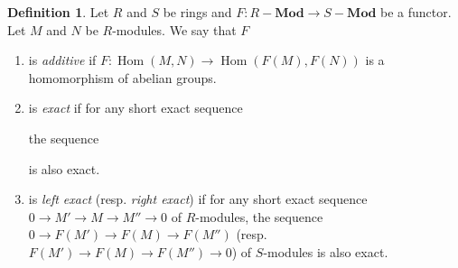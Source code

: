 \documentclass[10pt,letterpaper,cm]{nupset}
\theoremstyle{definition}
\newtheorem*{definition}{Definition}
\newcommand{\1}{\mathbf{1}}
\newcommand{\0}{\vec 0}
\DeclareMathOperator{\Hom}{Hom}
\begin{document}
\begin{definition} Let $R$ and $S$ be rings and $F: R{-} \mathbf{Mod} \to S{-}\mathbf{Mod}$ be a functor. Let $M$ and $N$ be $R$-modules. We say that $F$
\begin{enumerate}
\item is \textit{additive} if $F : \Hom(M, N) \to \Hom(F(M), F(N))$ is a homomorphism of abelian groups.
\item is \textit{exact} if for any short exact sequence 
the sequence
 is also exact.
\item is \textit{left exact} (resp. \textit{right exact}) if for any short exact sequence $0 \to M' \to M \to M'' \to 0$ of $R$-modules, the sequence $0 \to F(M') \to F(M) \to F(M'')$ (resp. $F(M') \to F(M) \to F(M'') \to 0$) of $S$-modules is also exact.
\end{enumerate}
\end{definition}
\end{document}
